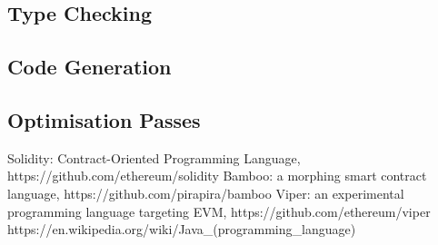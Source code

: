 \documentclass{article}
\begin{document}
\subsection{Type Checking}
\label{subsec:type_checking}
\subsection{Code Generation}
\label{subsec:code_generation}
\subsection{Optimisation Passes}
\label{subsec:optimisation_passes}

\begin{thebibliography}{9}

  Solidity: Contract-Oriented Programming Language, https://github.com/ethereum/solidity
  Bamboo: a morphing smart contract language, https://github.com/pirapira/bamboo
  Viper: an experimental programming language targeting EVM, https://github.com/ethereum/viper
  https://en.wikipedia.org/wiki/Java\_(programming\_language)

\end{thebibliography}
\end{document}
